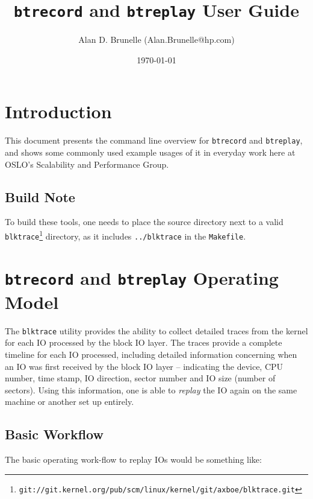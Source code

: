 \documentclass{article}
\begin{document}
\title{\texttt{btrecord} and \texttt{btreplay} User Guide}
\author{Alan D. Brunelle (Alan.Brunelle@hp.com)}
\date{\today}
\maketitle
\begin{abstract}

\end{abstract}
\thispagestyle{empty}\newpage
\tableofcontents\thispagestyle{empty}\newpage
\section{Introduction}


\bigskip 
This document presents the command line overview for
\texttt{btrecord} and \texttt{btreplay}, and shows some commonly used
example usages of it in everyday work here at OSLO's Scalability and
Performance Group.

\subsection*{Build Note}

To build these tools, one needs to
place the source directory next to a valid
\texttt{blktrace}\footnote{\texttt{git://git.kernel.org/pub/scm/linux/kernel/git/axboe/blktrace.git}}
directory, as it includes \texttt{../blktrace} in the \texttt{Makefile}.


\newpage\section{\texttt{btrecord} and \texttt{btreplay} Operating Model}

The \texttt{blktrace} utility provides the ability to collect detailed
traces from the kernel for each IO processed by the block IO layer. The
traces provide a complete timeline for each IO processed, including
detailed information concerning when an IO was first received by the block
IO layer -- indicating the device, CPU number, time stamp, IO direction,
sector number and IO size (number of sectors). Using this information,
one is able to \emph{replay} the IO again on the same machine or another
set up entirely.

\subsection{Basic Workflow}
The basic operating work-flow to replay IOs would be something like:
\end{document}
